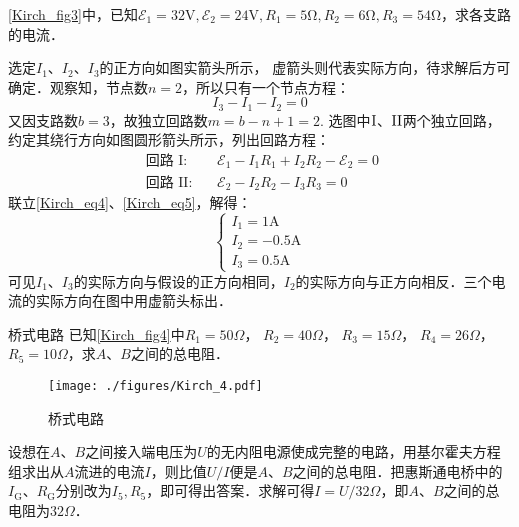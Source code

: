 \begin{example}{}
\autoref{Kirch_fig3}中，已知$\mathscr{E}_{1}=32 \mathrm{V}, \mathscr{E}_{2}=24 \mathrm{V}, R_{1}=5 \mathrm{\Omega}, R_{2}=6 \mathrm{\Omega}, R_{3}=54 \mathrm{Ω}$，求各支路的电流．

选定$I_1$、$I_2$、$I_3$的正方向如图实箭头所示， 虚箭头则代表实际方向，待求解后方可确定．观察知，节点数$n =2$，所以只有一个节点方程：
\begin{equation} \label{Kirch_eq4}
I_{3}-I_{1}-I_{2}=0
\end{equation}
又因支路数$b=3$，故独立回路数$m = b - n + 1 =2 $. 选图中$\rm I$、$\rm II$两个独立回路，约定其绕行方向如图圆形箭头所示，列出回路方程：
\begin{equation} \label{Kirch_eq5}
\begin{aligned}\text { 回路 } \mathrm{I}: && \mathscr{E}_{1} - I_{1} R_{1} + I_{2} R_{2} -\mathscr{E}_{2} = 0\\ \text { 回路 } \mathrm{II}: && \mathscr{E}_{2} - I_{2} R_{2} - I_{3} R_{3} = 0\end{aligned}
\end{equation}
联立\autoref{Kirch_eq4}、\autoref{Kirch_eq5}，解得：
\begin{equation}
\begin{cases}
I_{1}=1 \mathrm{A} \\ 
I_{2}=-0.5 \mathrm{A} \\
I_{3}=0.5 \mathrm{A}
\end{cases}
\end{equation}
可见$I_1$、$I_3$的实际方向与假设的正方向相同，$I_2$的实际方向与正方向相反．三个电流的实际方向在图中用虚箭头标出．
\end{example}

\begin{example}{桥式电路}
已知\autoref{Kirch_fig4}中$R_{1}=50 \Omega$， $ R_{2}=40 \Omega$， $ R_{3}=15 \Omega$， $ R_{4}=26 \Omega$， $ R_{5}=10 \Omega$，求$A $、$B $之间的总电阻．
\begin{figure}[ht]
\centering
\texttt{[image: ./figures/Kirch\_4.pdf]}
\caption{桥式电路} \label{Kirch_fig4}
\end{figure}

设想在$A $、$B $之间接入端电压为$U $的无内阻电源使成完整的电路，用基尔霍夫方程组求出从$A $流进的电流$I$，则比值$U/I$便是$A$、$B$之间的总电阻．把惠斯通电桥中的$I_\mathrm{G}$、$R_\mathrm{G}$分别改为$I_5,R_5$，即可得出答案．求解可得$I=U/32\Omega$，即$A$、$B$之间的总电阻为$32\Omega$．
\end{example}

